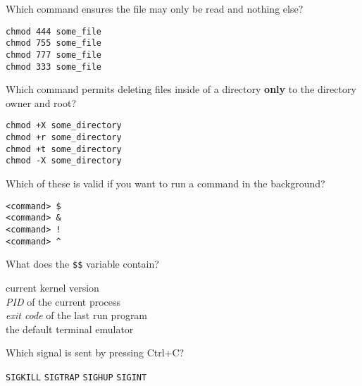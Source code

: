 \documentclass[a4paper,11pt]{exam}
\newcommand{\shell}[1]{\texttt{#1}}
\begin{document}
\begin{questions}
	\question
  Which command ensures the file may only be read and nothing else? 

	\begin{oneparchoices}
		\CorrectChoice \shell{chmod 444 some\_file}\\ 
		\choice \shell{chmod 755 some\_file} \\
		\choice \shell{chmod 777 some\_file} \\
		\choice \shell{chmod 333 some\_file}
	\end{oneparchoices}
	
	\question
	Which command permits deleting files inside of a directory \textbf{only} to the directory owner and root?
	
	\begin{oneparchoices}
		\choice \shell{chmod +X some\_directory} \\
		\choice \shell{chmod +r some\_directory} \\
    	\CorrectChoice \shell{chmod +t some\_directory}\\ 	
	  \choice \shell{chmod -X some\_directory}
	\end{oneparchoices}

	\question
	Which of these is valid if you want to run a command in the background?

	\begin{oneparchoices}
		\choice \shell{<command> \$} \\
		\CorrectChoice \shell{<command> \&} \\
		\choice \shell{<command> !} \\
		\choice \shell{<command> \textasciicircum} \\
	\end{oneparchoices}
	
	\question
  What does the \shell{\$\$} variable contain?

	\begin{oneparchoices}
				\choice current kernel version\\
		\CorrectChoice \textit{PID} of the current process \\ 
		\choice \textit{exit code} of the last run program \\
		\choice the default terminal emulator
	\end{oneparchoices}
	
	\question
  Which signal is sent by pressing Ctrl+C? 

  \begin{oneparchoices}
		\choice \shell{SIGKILL}
		\choice \shell{SIGTRAP}
    \choice \shell{SIGHUP}
    \CorrectChoice \shell{SIGINT}  
  \end{oneparchoices}


\end{questions}
\end{document}
